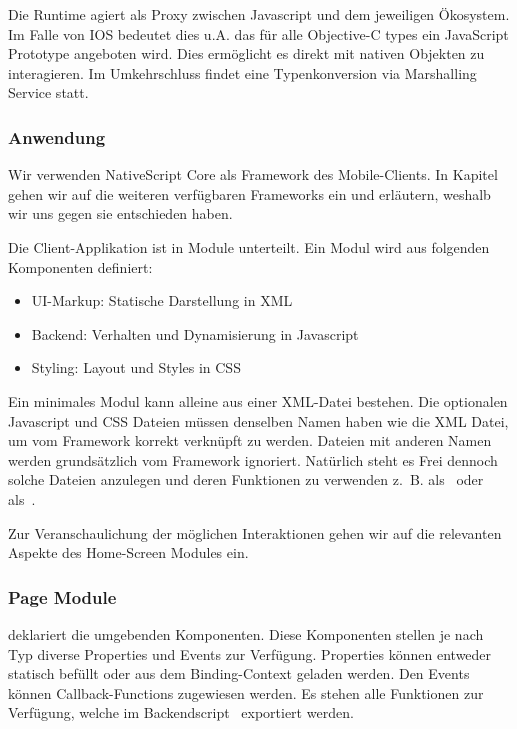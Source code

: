 Die Runtime agiert als Proxy zwischen Javascript und dem jeweiligen Ökosystem.
Im Falle von IOS bedeutet dies u.A. das für alle Objective-C types ein JavaScript Prototype angeboten wird.
Dies ermöglicht es direkt mit nativen Objekten zu interagieren.
Im Umkehrschluss findet eine Typenkonversion via Marshalling Service statt\cite{ns-ios-runtime}.

\subsubsection{Anwendung}
Wir verwenden NativeScript Core als Framework des Mobile-Clients.
In Kapitel~\emph{} gehen wir auf die weiteren verfügbaren Frameworks ein und erläutern, weshalb wir uns gegen sie entschieden haben.

Die Client-Applikation ist in Module unterteilt.
Ein Modul wird aus folgenden Komponenten definiert:
\begin{itemize}
    \item UI-Markup: Statische Darstellung in XML
    \item Backend: Verhalten und Dynamisierung in Javascript
    \item Styling: Layout und Styles in CSS
\end{itemize}

Ein minimales Modul kann alleine aus einer XML-Datei bestehen.
Die optionalen Javascript und CSS Dateien müssen denselben Namen haben wie die XML Datei, um vom Framework korrekt verknüpft zu werden.
Dateien mit anderen Namen werden grundsätzlich vom Framework ignoriert.
Natürlich steht es Frei dennoch solche Dateien anzulegen und deren Funktionen zu verwenden z.~B. als~\emph{} oder als~\emph{}.

Zur Veranschaulichung der möglichen Interaktionen gehen wir auf die relevanten Aspekte des Home-Screen Modules ein.

\subsubsection*{Page Module}


\emph{} deklariert die umgebenden Komponenten.
Diese Komponenten stellen je nach Typ diverse Properties und Events zur Verfügung.
Properties können entweder statisch befüllt oder aus dem Binding-Context geladen werden.
Den Events können Callback-Functions zugewiesen werden.
Es stehen alle Funktionen zur Verfügung, welche im Backendscript~\emph{} exportiert werden.


